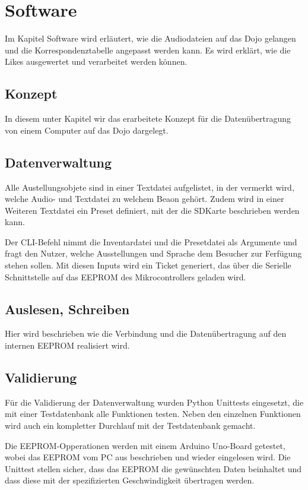 \chapter{Software}
\thispagestyle{fancy} 
Im Kapitel Software wird erläutert, wie die Audiodateien auf das Dojo gelangen und die Korrespondenztabelle angepasst werden kann. Es wird erklärt, wie die Likes ausgewertet und verarbeitet werden können.
\section{Konzept}
In diesem unter Kapitel wir das erarbeitete Konzept für die Datenübertragung von einem Computer auf das Dojo dargelegt.

\section{Datenverwaltung}
Alle Austellungsobjete sind in einer Textdatei aufgelistet, in der vermerkt wird, welche Audio- und Textdatei zu welchem Beaon gehört.
Zudem wird in einer Weiteren Textdatei ein Preset definiert, mit der die SDKarte beschrieben werden kann.

Der CLI-Befehl nimmt die Inventardatei und die Presetdatei als Argumente und fragt den Nutzer, welche Ausstellungen und Sprache dem Besucher zur Ferfügung stehen sollen. 
Mit diesen Inputs wird ein Ticket generiert, das über die Serielle Schnittstelle auf das EEPROM des Mikrocontrollers geladen wird.


\section{Auslesen, Schreiben}
Hier wird beschrieben wie die Verbindung und die Datenübertragung auf den internen EEPROM realisiert wird.

\section{Validierung}
Für die Validierung der Datenverwaltung wurden Python Unittests eingesetzt, die mit einer Testdatenbank alle Funktionen testen.
Neben den einzelnen Funktionen wird auch ein kompletter Durchlauf mit der Testdatenbank gemacht.

Die EEPROM-Opperationen werden mit einem Arduino Uno-Board getestet, wobei das EEPROM vom PC aus beschrieben und wieder eingelesen wird.
Die Unittest stellen sicher, dass das EEPROM die gewünschten Daten beinhaltet und dass diese mit der spezifizierten Geschwindigkeit übertragen werden.


